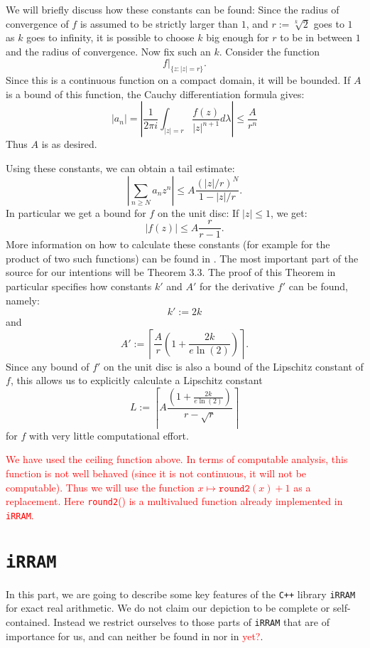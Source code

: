 \documentclass{article}
\newcommand{\irram}{\texttt{iRRAM}\xspace}
\newcommand{\cc}{\texttt{C++}\xspace}
\newcommand{\ir}[1]{\texttt{#1}}
\newcommand{\temp}[1]{\textcolor{red}{#1}}
\begin{document}
We will briefly discuss how these constants can be found: Since the radius of convergence of $f$ is assumed to be strictly larger than $1$, and $r:=\sqrt[k] 2$ goes to $1$ as $k$ goes to infinity, it is possible to choose $k$ big enough for $r$ to be in between $1$ and the radius of convergence. Now fix such an $k$. Consider the function
\[ f|_{\{z:|z| = r\}}. \]
Since this is a continuous function on a compact domain, it will be bounded. If $A$ is a bound of this function, the Cauchy differentiation formula gives:
\[ |a_n |=  \left|\frac 1 {2\pi i}\int_{|z| = r} \frac{f(z)}{|z|^{n+1}} d\lambda\right| \leq \frac A {r^n} \]
Thus $A$ is as desired.

Using these constants, we can obtain a tail estimate:
\[ \left|\sum_{n \geq N} a_n z^n\right| \leq A \frac{(|z|/r)^N}{1- |z|/r}. \]
In particular we get a bound for $f$ on the unit disc: If $|z|\leq 1$, we get:
\[ |f(z)| \leq A\frac r{r-1}. \]
More information on how to calculate these constants (for example for the product of two such functions) can be found in \ref{}. The most important part of the source for our intentions will be Theorem 3.3. The proof of this Theorem in particular specifies how constants $k'$ and $A'$ for the derivative $f'$ can be found, namely:
\[ k' := 2 k \]
and
\[ A' := \left\lceil \frac{A}{r} \left(1+ \frac{2k}{e \ln(2)}\right)\right\rceil. \]
Since any bound of $f'$ on the unit disc is also a bound of the Lipschitz constant of $f$, this allows us to explicitly calculate a Lipschitz constant
\[ L := \left\lceil A \frac{\left(1 + \frac{2k}{e\ln(2)}\right)}{r-\sqrt{r}}\right\rceil \]
for $f$ with very little computational effort.

\temp{We have used the ceiling function above. In terms of computable analysis, this function is not well behaved (since it is not continuous, it will not be computable). Thus we will use the function $x \mapsto \ir{round2}(x) +1$ as a replacement. Here \ir{round2}() is a multivalued function already implemented in \irram.}

\part{\irram}

In this part, we are going to describe some key features of the \cc library \irram for exact real arithmetic. We do not claim our depiction to be complete or self-contained. Instead we restrict ourselves to those parts of \irram that are of importance for us, and can neither be found in \cite{} nor in \cite{} \temp{yet?}.
\end{document}
